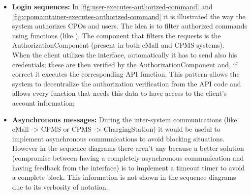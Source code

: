 \begin{itemize}
    \item \textbf{Login sequences:} In \autoref{fig:user-executes-authorized-command} and \autoref{fig:cpomaintainer-executes-authorized-command} it is illustrated the way the system authorizes \acp{CPO} and users. The idea is to filter authorized commands using functions (like \cite{ref:command-pattern}). The component that filters the requests is the AuthorizationComponent (present in both \ac{eMall} and \ac{CPMS} systems).\\
          When the client utilizes the interface, automatically it has to send also his credentials; these are then verified by the AuthorizationComponent and, if correct it executes the corresponding API function. This pattern allows the system to decentralize the authorization verification from the API code and allows every function that needs this data to have access to the client's account information;
    \item \textbf{Asynchronous messages:} During the inter-system communications (like \ac{eMall} -> \ac{CPMS} or \ac{CPMS} -> ChargingStation) it would be useful to implement asynchronous communications to avoid blocking situations. However in the sequence diagrams there aren't any because a better solution (compromise between having a completely asynchronous communication and having feedback from the interface) is to implement a timeout timer to avoid a complete block. This information is not shown in the sequence diagrams due to its verbosity of notation.

\end{itemize}
\clearpage
